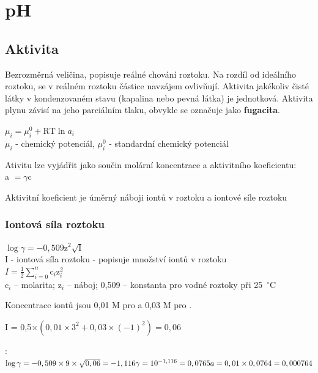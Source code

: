\section{pH}

\subsection{Aktivita}

Bezrozměrná veličina, popisuje reálné chování roztoku. Na rozdíl od ideálního roztoku, se v reálném roztoku částice navzájem ovlivňují. Aktivita jakékoliv čisté látky v kondenzovaném stavu (kapalina nebo pevná látka) je jednotková. Aktivita plynu závisí na jeho parciálním tlaku, obvykle se označuje jako \textbf{fugacita}.

$\mu_i = \mu_i^0 + \textrm{RT} \ln a_i$\\
$\mu_i$ - chemický potenciál, $\mu_i^0$ - standardní chemický potenciál

Ativitu lze vyjádřit jako součin molární koncentrace a aktivitního koeficientu:\\
a $ = \gamma $c

Aktivitní koeficient je úměrný náboji iontů v roztoku a iontové síle roztoku

\subsubsection{Iontová síla roztoku}
$\log \gamma = -0,509\textrm{z}^2\sqrt{\textrm{I}}$\\
I - iontová síla roztoku - popisuje množství iontů v roztoku\\
$I = \frac{1}{2}\sum\limits_{i=0}^n \textrm{c}_i \textrm{z}^2_i$\\
c$_i$ -- molarita; z$_i$ -- náboj; 0,509 -- konstanta pro vodné roztoky při 25~$^\circ$C



Koncentrace iontů jsou 0,01 M pro  a 0,03 M pro .

I = 0,5$\times(0,01\times3^2 + 0,03\times(-1)^2) = 0,06$

:\\
$\log\gamma = -0,509\times9\times\sqrt{0,06} = -1,116\\
\gamma = 10^{-1,116} = 0,0765\\
a = 0,01\times0,0764 = 0,000764$

